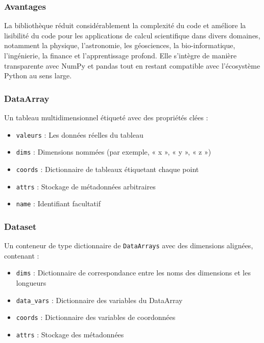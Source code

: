 \documentclass[
  french,
  11pt,
  letterpaper,
  open=any,
  twoside=false,
  french]{scrbook}
\begin{document}
\subsubsection{Avantages}\label{avantages}

La bibliothèque réduit considérablement la complexité du code et
améliore la lisibilité du code pour les applications de calcul
scientifique dans divers domaines, notamment la physique, l'astronomie,
les géosciences, la bio-informatique, l'ingénierie, la finance et
l'apprentissage profond. Elle s'intègre de manière transparente avec
NumPy et pandas tout en restant compatible avec l'écosystème Python au
sens large.

\subsubsection{DataArray}\label{dataarray}

Un tableau multidimensionnel étiqueté avec des propriétés clées :

\begin{itemize}
\item
  \texttt{valeurs} : Les données réelles du tableau
\item
  \texttt{dims} : Dimensions nommées (par exemple, « x », « y », « z »)
\item
  \texttt{coords} : Dictionnaire de tableaux étiquetant chaque point
\item
  \texttt{attrs} : Stockage de métadonnées arbitraires
\item
  \texttt{name} : Identifiant facultatif
\end{itemize}

\subsubsection{Dataset}\label{dataset}

Un conteneur de type dictionnaire de \texttt{DataArrays} avec des
dimensions alignées, contenant :

\begin{itemize}
\item
  \texttt{dims} : Dictionnaire de correspondance entre les noms des
  dimensions et les longueurs
\item
  \texttt{data\_vars} : Dictionnaire des variables du DataArray
\item
  \texttt{coords} : Dictionnaire des variables de coordonnées
\item
  \texttt{attrs} : Stockage des métadonnées
\end{itemize}
\end{document}
